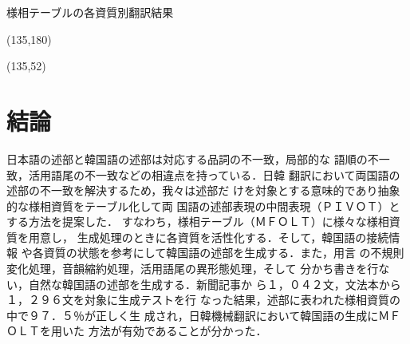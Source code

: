 \clearpage

\begin{table}[h]
\caption{様相テーブルの各資質別翻訳結果}
\atari(135,180)
\end{table}

\clearpage

\begin{table}[h]
\atari(135,52)
\end{table}

\vspace*{-7mm}

\section{結論}
日本語の述部と韓国語の述部は対応する品詞の不一致，局部的な
語順の不一致，活用語尾の不一致などの相違点を持っている．日韓
翻訳において両国語の述部の不一致を解決するため，我々は述部だ
けを対象とする意味的であり抽象的な様相資質をテーブル化して両
国語の述部表現の中間表現（ＰＩＶＯＴ）とする方法を提案した．
すなわち，様相テーブル（ＭＦＯＬＴ）に様々な様相資質を用意し，
生成処理のときに各資質を活性化する．そして，韓国語の接続情報
や各資質の状態を参考にして韓国語の述部を生成する．また，用言
の不規則変化処理，音韻縮約処理，活用語尾の異形態処理，そして
分かち書きを行ない，自然な韓国語の述部を生成する．新聞記事か
ら１，０４２文，文法本から１，２９６文を対象に生成テストを行
なった結果，述部に表われた様相資質の中で９７．５％が正しく生
成され，日韓機械翻訳において韓国語の生成にＭＦＯＬＴを用いた
方法が有効であることが分かった．







\begin{biography}



\end{biography}




